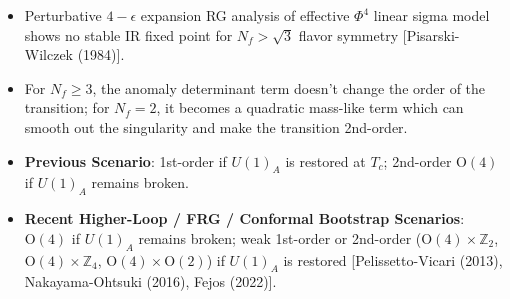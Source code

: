 \documentclass[10pt, aspectratio=169]{beamer} %
\begin{document}
\begin{frame}[noframenumbering]
\vfill
{}
\fontsize{9pt}{11.5pt}\selectfont
\begin{itemize}
    \item Perturbative $4-\epsilon$ expansion RG analysis of effective $\Phi^4$ linear sigma model shows no stable IR fixed point for $N_f > \sqrt{3}$ flavor symmetry {\scriptsize [Pisarski-Wilczek (1984)]}.
    \item For $N_f \geq 3$, the anomaly determinant term doesn't change the order of the transition; for $N_f=2$, it becomes a quadratic mass-like term which can smooth out the singularity and make the transition 2nd-order.
    \item \textbf{Previous Scenario}: 1st-order if $U(1)_A$ is restored at $T_c$; 2nd-order $\mathrm{O}(4)$ if $U(1)_A$ remains broken.
    \item \textbf{Recent Higher-Loop / FRG / Conformal Bootstrap Scenarios}: $\mathrm{O}(4)$ if $U(1)_A$ remains broken; weak 1st-order or 2nd-order ($\mathrm{O}(4)\times \mathbb{Z}_2$, $\mathrm{O}(4)\times \mathbb{Z}_4$, $\mathrm{O}(4)\times \mathrm{O}(2)$) if $U(1)_A$ is restored {\scriptsize [Pelissetto-Vicari (2013), Nakayama-Ohtsuki (2016), Fejos (2022)]}.
\end{itemize}
\vfill
\end{frame}
\end{document}
